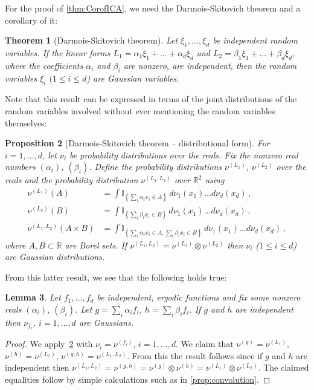 \documentclass[english]{article} %
\newcommand{\todoc}[2][]{\todo[color=Apricot,#1]{#2}}
\newcommand{\cset}[2]{\left\{#1\,:\,#2\right\}}
\newcommand{\ind}[1]{\mathbb{I}_{\left\{ #1 \right\}}}
\newcommand{\real}{\mathbb{R}}
\newtheorem{lemma}{Lemma}[section]
\newtheorem{thm}[lemma]{Theorem}
\newtheorem{prop}[lemma]{Proposition}
\theoremstyle{definition}
\begin{document}
For the proof of \cref{thm:CorofICA}, we need the Darmois-Skitovich theorem and a corollary of it:
\begin{thm}[Darmois-Skitovich theorem]
Let $\xi_1,\ldots,\xi_d$ be independent random variables. If the linear forms $L_1 = \alpha_1\xi_1 + \ldots + \alpha_d\xi_d$ and $L_2 = \beta_1\xi_1 +\ldots + \beta_d\xi_d$, where the coefficients $\alpha_i$ and $\beta_i$ are nonzero, are independent, then the random variables $\xi_i$ $(1\le i \le d$) are Gaussian variables.
\end{thm}


Note that this result can  be expressed in terms of the joint distributions of the random variables involved without ever mentioning the random variables themselves:
\begin{prop}[Darmois-Skitovich theorem -- distributional form]
\label{prop:Darmois-Skitovich-distr}
For $i=1,\ldots, d$, let $\nu_i$ be probability distributions over the reals.
Fix the nonzero real numbers $(\alpha_i)$, $(\beta_i)$.
Define the probability distributions $\nu^{(L_1)}$, $\nu^{(L_2)}$ over the reals and 
the probability distribution
 $\nu^{(L_1,L_2)}$ over $\real^2$ using
\begin{align*}
\nu^{(L_1)}(A) & = \int \ind{ \sum_i \alpha_i x_i \in A} \,d\nu_1(x_1)\dots d\nu_d(x_d)\,,\\
\nu^{(L_2)}(B) & = \int \ind{ \sum_i \beta_i x_i \in B} \,d\nu_1(x_1)\dots d\nu_d(x_d)\,,\\
\nu^{(L_1,L_2)}(A\times B) 
& = \int \ind{ \sum_i \alpha_i x_i \in A, \sum_i \beta_i x_i\in B} \,d\nu_1(x_1)\dots d\nu_d(x_d)\,,
\end{align*}
where $A,B\subset \real$ are Borel sets.
If $\nu^{(L_1,L_2)} = \nu^{(L_1)} \otimes \nu^{(L_2)}$ then $\nu_i$ ($1\le i \le d$) are Gaussian distributions.
\end{prop}

From this latter result, we see that the following holds true:
\begin{lemma}
Let $f_1,\ldots,f_d$ be independent, ergodic functions and fix some nonzero reals
 $(\alpha_i)$, $(\beta_i)$.
Let $g = \sum_i \alpha_i f_i$, $h = \sum_i \beta_i f_i$.
If $g$ and $h$ are independent then $\nu_{f_i}$, $i=1,\ldots,d$ are Gaussians.
\end{lemma}
\begin{proof}
We apply~\cref{prop:Darmois-Skitovich-distr} with $\nu_i = \nu^{(f_i)}$, $i=1,\ldots,d$.
We claim that $\nu^{(g)} = \nu^{(L_1)}$, $\nu^{(h)} = \nu^{(L_2)}$,
$\nu^{(g,h)} = \nu^{(L_1,L_2)}$.
From this the result follows since if $g$ and $h$ are independent then $\nu^{(L_1,L_2)} = \nu^{(g,h)} = \nu^{(g)} \otimes \nu^{(h)} = \nu^{(L_1)} \otimes \nu^{(L_2)}$.
The claimed equalities follow by simple calculations such as in \cref{prop:convolution}. \todoc{At least I think..}
\end{proof}
\end{document}
